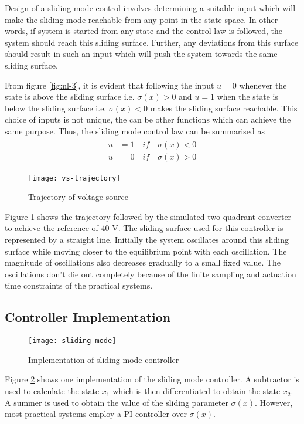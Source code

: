 	Design of a sliding mode control involves determining a suitable input which will make the sliding mode reachable from any point in the state space. In other words, if system is started from any state and the control law is followed, the system should reach this sliding surface. Further, any deviations from this surface should result in such an input which will push the system towards the same sliding surface.
	
	From figure \ref{fig:nl-3}, it is evident that following the input $u=0$ whenever the state is above the sliding surface \cite{spiazzi1997sliding} i.e. $\sigma (x) > 0$ and $u=1$ when the state is below the sliding surface i.e. $\sigma (x) < 0$ makes the sliding surface reachable. This choice of inputs is not unique, the can be other functions which can achieve the same purpose. Thus, the sliding mode control law can be summarised as
    \begin{align}
    	\begin{split}
	        u &= 1 \quad if \quad \sigma (x) < 0\\
	        u &= 0 \quad if \quad \sigma (x) > 0
	        \label{eq:nl-3}
	    \end{split}
    \end{align}
    \begin{figure}[h]
      \centering
      \texttt{[image: vs-trajectory]}
      \vspace{-0.5cm}
      \caption{Trajectory of voltage source}
      \label{fig:nl-4}
	\end{figure}
    Figure \ref{fig:nl-4} shows the trajectory followed by the simulated two quadrant converter to achieve the reference of 40 V. The sliding surface used for this controller is represented by a straight line. Initially the system oscillates around this sliding surface while moving closer to the equilibrium point with each oscillation. The magnitude of oscillations also decreases gradually to a small fixed value. The oscillations don't die out completely because of the finite sampling and actuation time constraints of the practical systems.

\subsection{Controller Implementation}
    \begin{figure}[h]
      \centering
      \texttt{[image: sliding-mode]}
      \caption{Implementation of sliding mode controller}
      \label{fig:nl-5}
	\end{figure}
	Figure \ref{fig:nl-5} shows one implementation of the sliding mode controller. A subtractor is used to calculate the state $x_1$ which is then differentiated to obtain the state $x_2$. A summer is used to obtain the value of the sliding parameter $\sigma(x)$. However, most practical systems employ a PI controller over $\sigma(x)$.
	
